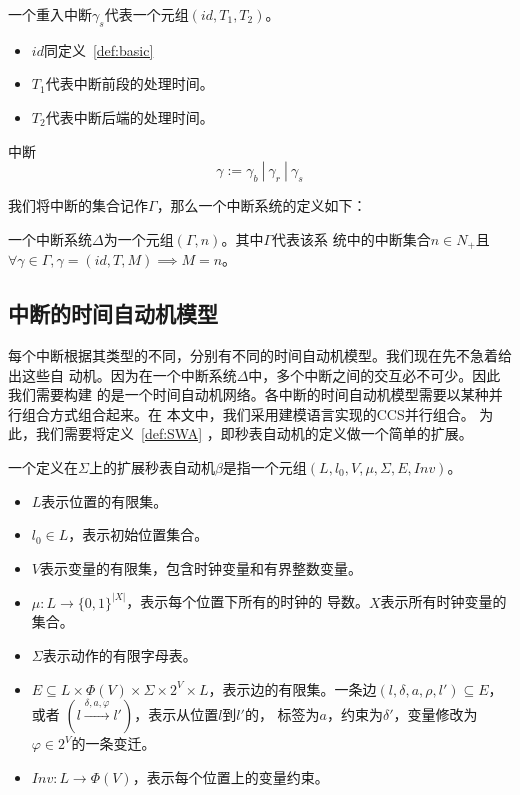 \begin{definition}
	\label{def:segment}
	一个重入中断$\gamma_s$代表一个元组$(id, T_1, T_2)$。
	\begin{itemize}
		\item $id$同定义~\ref{def:basic}
		\item $T_1$代表中断前段的处理时间。
		\item $T_2$代表中断后端的处理时间。
	\end{itemize}
\end{definition}

\begin{definition}
	\label{def:intr}
	中断
	\begin{equation}
		\gamma := \gamma_b~|~\gamma_r~|~\gamma_s
	\end{equation}
\end{definition}

我们将中断的集合记作$\varGamma$，那么一个中断系统的定义如下：

\begin{definition}
	一个中断系统$\Delta$为一个元组$(\varGamma,n)$。其中$\varGamma$代表该系
	统中的中断集合$n\in N_+$且$\forall \gamma\in\varGamma, \gamma=(id, T, M)
	\implies M = n$。
\end{definition}

\subsection{中断的时间自动机模型}
\label{subsec:intr_automata}

每个中断根据其类型的不同，分别有不同的时间自动机模型。我们现在先不急着给出这些自
动机。因为在一个中断系统$\Delta$中，多个中断之间的交互必不可少。因此我们需要构建
的是一个时间自动机网络。各中断的时间自动机模型需要以某种并行组合方式组合起来。在
本文中，我们采用\uppaal 建模语言实现的CCS并行组合\cite{Bengtsson04timedautomata:}。
为此，我们需要将定义~\ref{def:SWA} ，即秒表自动机的定义做一个简单的扩展。

\begin{definition}
	\label{def:SWA_ext}
	一个定义在$\varSigma$上的扩展秒表自动机$\beta$是指一个元组$(L,l_0,V,\mu,
	\varSigma,E,Inv)$。
	\begin{itemize}
		\item $L$表示位置的有限集。
		\item $l_0\in L$，表示初始位置集合。
		\item $V$表示变量的有限集，包含时钟变量和有界整数变量。
		\item $\mu:L\longrightarrow \{0,1\}^{|X|}$，表示每个位置下所有的时钟的
		导数。$X$表示所有时钟变量的集合。
		\item $\varSigma$表示动作的有限字母表。
		\item $E\subseteq L\times \varPhi(V)\times \varSigma \times 2^V
		\times L$，表示边的有限集。一条边$(l,\delta,a,\rho,l')\subseteq E$，或者
		$(l\stackrel{\delta,a,\varphi}{\longrightarrow}l')$，表示从位置$l$到$l'$的，
		标签为$a$，约束为$\delta'$，变量修改为$\varphi \in 2^V$的一条变迁。
		\item $Inv:L\longrightarrow \varPhi(V)$，表示每个位置上的变量约束。
	\end{itemize}
\end{definition}

